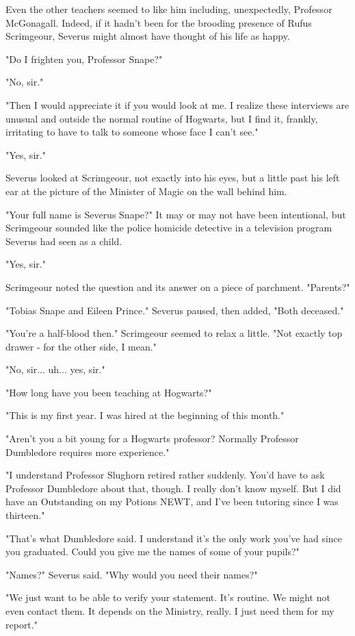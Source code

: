 \documentclass[a4paper,11pt]{article}
\begin{document}
Even the other teachers seemed to like him including, unexpectedly, Professor McGonagall. Indeed, if it hadn't been for the brooding presence of Rufus Scrimgeour, Severus might almost have thought of his life as happy.

"Do I frighten you, Professor Snape?"

"No, sir."

"Then I would appreciate it if you would look at me. I realize these interviews are unusual and outside the normal routine of Hogwarts, but I find it, frankly, irritating to have to talk to someone whose face I can't see."

"Yes, sir."

Severus looked at Scrimgeour, not exactly into his eyes, but a little past his left ear at the picture of the Minister of Magic on the wall behind him.

"Your full name is Severus Snape?" It may or may not have been intentional, but Scrimgeour sounded like the police homicide detective in a television program Severus had seen as a child.

"Yes, sir."

Scrimgeour noted the question and its answer on a piece of parchment. "Parents?"

"Tobias Snape and Eileen Prince." Severus paused, then added, "Both deceased."

"You're a half-blood then." Scrimgeour seemed to relax a little. "Not exactly top drawer - for the other side, I mean."

"No, sir... uh... yes, sir."

"How long have you been teaching at Hogwarts?"

"This is my first year. I was hired at the beginning of this month."

"Aren't you a bit young for a Hogwarts professor? Normally Professor Dumbledore requires more experience."

"I understand Professor Slughorn retired rather suddenly. You'd have to ask Professor Dumbledore about that, though. I really don't know myself. But I did have an Outstanding on my Potions NEWT, and I've been tutoring since I was thirteen."

"That's what Dumbledore said. I understand it's the only work you've had since you graduated. Could you give me the names of some of your pupils?"

"Names?" Severus said. "Why would you need their names?"

"We just want to be able to verify your statement. It's routine. We might not even contact them. It depends on the Ministry, really. I just need them for my report."
\end{document}
